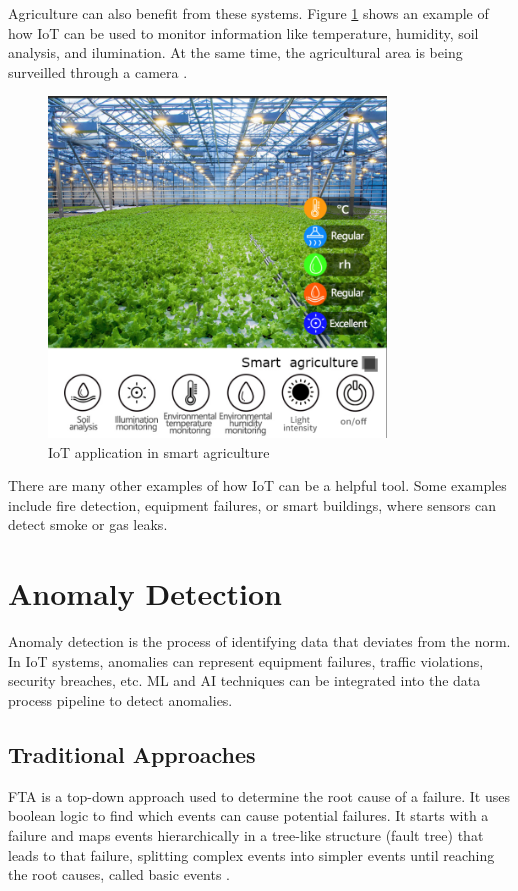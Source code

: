 Agriculture can also benefit from these systems. Figure \ref{fig:monitoring:smartagriculture}
shows an example of how \gls{IoT} can be used to monitor information like
temperature, humidity, soil analysis, and ilumination. At the same time, the
agricultural area is being surveilled through a camera \cite{hengko_smart_agriculture}.

\begin{figure}[H]
	\centering
	\includegraphics[width=0.8\textwidth, height=0.5\textheight, keepaspectratio]{Chapters/Figures/Monitoring/SmartAgriculture.png}
	\caption{\gls{IoT} application in smart agriculture\cite{hengko_smart_agriculture}}
	\label{fig:monitoring:smartagriculture}
\end{figure}

There are many other examples of how \gls{IoT} can be a helpful tool. Some
examples include fire detection, equipment failures, or  smart buildings, where
sensors can detect smoke or gas leaks.

\section{Anomaly Detection}
Anomaly detection is the process of identifying data that deviates from the norm.
In \gls{IoT} systems, anomalies can represent equipment failures, traffic violations,
security breaches, etc. \gls{ML} and \gls{AI} techniques
can be integrated into the data process pipeline to detect anomalies.

\subsection{Traditional Approaches}
\gls{FTA} is a top-down approach used to determine the root cause of a failure.
It uses boolean logic to find which events can cause potential failures. It
starts with a failure and maps events hierarchically in a tree-like structure
(fault tree) that leads to that failure, splitting complex events into simpler
events until reaching the root causes, called basic events \cite{IBMFTA}.

